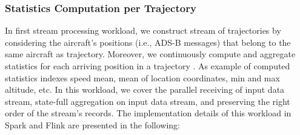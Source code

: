 \documentclass[]{article}
\begin{document}
\subsubsection{Statistics Computation per Trajectory}
In first stream processing workload, we construct stream of trajectories by considering  the aircraft's positions (i.e., ADS-B messages) that belong to the same aircraft as trajectory. Moreover, we continuously compute and aggregate statistics for each arriving position in a  trajectory . As example of computed statistics indexes speed mean, mean of location coordinates, min and max altitude, etc. In this workload, we  cover the parallel receiving of input data stream, state-full aggregation on input data stream, and preserving the right order of the stream's records.
The implementation details of this workload in Spark and Flink are presented in the following: 
\end{document}
